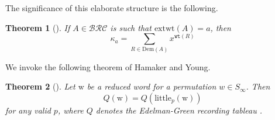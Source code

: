 \documentclass{amsart}
\newtheorem{theorem}{Theorem}[section]
\theoremstyle{definition}
\theoremstyle{remark}
\numberwithin{equation}{subsection}
\newcommand{\wtt}{\mathtt{wt}}
\newcommand{\BRC}{\mathcal{BRC}}
\newcommand{\ltb}{\mathrm{little}}
\begin{document}
The significance of this elaborate structure is the following.
\begin{theorem}[{\cite{lascoux1990keys,assaf2018demazure}}] \label{theorem:keykey}
If $A\in\BRC$ is such that $\mathrm{extwt}(A) = a$, then
$$\kappa_a = \sum_{R\in\mathrm{Dem}(A)} x^{\wtt(R)}$$
\end{theorem}

We invoke the following theorem of Hamaker and Young.

\begin{theorem}[{\cite[Theorem~4.4]{hamaker2014relating}}] \label{theorem:littlecrystal}
Let $\mathrm{w}$ be a reduced word for a permutation $w\in S_\infty$. Then
$$Q(\mathrm{w}) = Q(\ltb_p(\mathrm{w}))$$
for any valid $p$, where $Q$ denotes the Edelman-Green recording tableau \cite{edelman1987balanced}.
\end{theorem}
\end{document}
